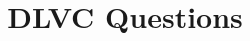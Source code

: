 \documentclass[11pt,a4paper]{article}
\title{DLVC Questions}
\author{ \authorname{Abraham Hinteregger} \\
}
\begin{document}
\maketitle
\listoftodos
\tableofcontents



\end{document}
